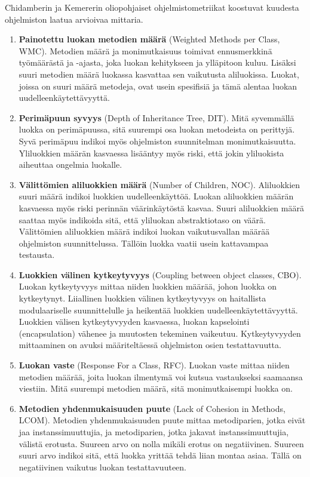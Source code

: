 \documentclass[finnish]{tktltiki2}
\theoremstyle{definition}
\theoremstyle{remark}
\begin{document}
Chidamberin ja Kemererin oliopohjaiset ohjelmistometriikat koostuvat kuudesta ohjelmiston laatua arvioivaa mittaria.

\begin{enumerate}
    \item \textbf{Painotettu luokan metodien määrä} (Weighted Methods per Class, WMC). Metodien määrä ja monimutkaisuus toimivat ennusmerkkinä työmäärästä ja -ajasta, joka luokan kehitykseen ja ylläpitoon kuluu. Lisäksi suuri metodien määrä luokassa kasvattaa sen vaikutusta aliluokissa. Luokat, joissa on suuri määrä metodeja, ovat usein spesifisiä ja tämä alentaa luokan uudelleenkäytettävyyttä.

    \item \textbf{Perimäpuun syvyys} (Depth of Inheritance Tree, DIT). Mitä syvemmällä luokka on perimäpuussa, sitä suurempi osa luokan metodeista on perittyjä. Syvä perimäpuu indikoi myös ohjelmiston suunnitelman monimutkaisuutta. Yliluokkien määrän kasvaessa lisääntyy myös riski, että jokin yliluokista aiheuttaa ongelmia luokalle.

    \item \textbf{Välittömien aliluokkien määrä} (Number of Children, NOC). Aliluokkien suuri määrä indikoi luokkien uudelleenkäyttöä. Luokan aliluokkien määrän kasvaessa myös riski perinnän väärinkäytöstä kasvaa. Suuri aliluokkien määrä saattaa myös indikoida sitä, että yliluokan abstraktiotaso on väärä. Välittömien aliluokkien määrä indikoi luokan vaikutusvallan määrää ohjelmiston suunnittelussa. Tällöin luokka vaatii usein kattavampaa testausta.

    \item \textbf{Luokkien välinen kytkeytyvyys} (Coupling between object classes, CBO). Luokan kytkeytyvyys mittaa niiden luokkien määrää, johon luokka on kytkeytynyt. Liiallinen luokkien välinen kytkeytyvyys on haitallista modulaariselle suunnittelulle ja heikentää luokkien uudelleenkäytettävyyttä. Luokkien välisen kytkeytyvyyden kasvaessa, luokan kapselointi (encapsulation) vähenee ja muutosten tekeminen vaikeutuu. Kytkeytyvyyden mittaaminen on avuksi määriteltäessä ohjelmiston osien testattavuutta.

    \item \textbf{Luokan vaste} (Response For a Class, RFC). Luokan vaste mittaa niiden metodien määrää, joita luokan ilmentymä voi kutsua vastaukseksi saamaansa viestiin. Mitä suurempi metodien määrä, sitä monimutkaisempi luokka on.

    \item \textbf{Metodien yhdenmukaisuuden puute} (Lack of Cohesion in Methods, LCOM). Metodien yhdenmukaisuuden puute mittaa metodiparien, jotka eivät jaa instanssimuuttujia, ja metodiparien, jotka jakavat instanssimuuttujia, välistä erotusta. Suureen arvo on nolla mikäli erotus on negatiivinen. Suureen suuri arvo indikoi sitä, että luokka yrittää tehdä liian montaa asiaa. Tällä on negatiivinen vaikutus luokan testattavuuteen.
\end{enumerate}
\end{document}
